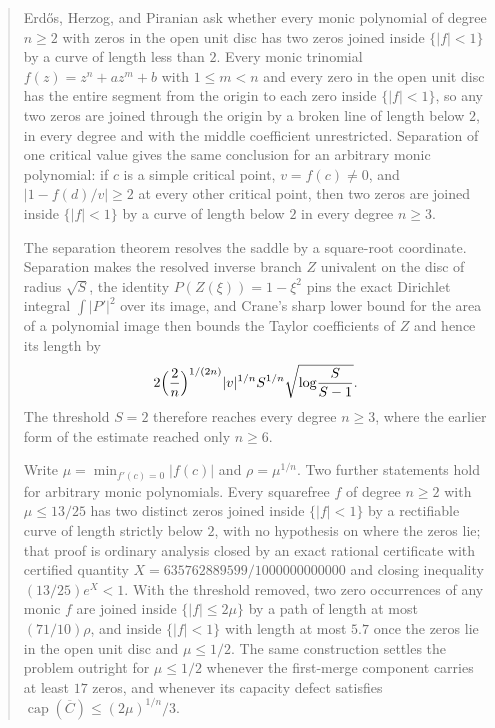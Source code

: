 \maketitle
\noteprovenance

\begin{abstract}
\noindent
Erd\H{o}s, Herzog, and Piranian ask whether every monic polynomial of degree
$n\ge2$ with zeros in the open unit disc has two zeros joined inside
$\{|f|<1\}$ by a curve of length less than $2$.  Every monic trinomial
$f(z)=z^n+az^m+b$ with $1\le m<n$ and every zero in the open unit disc has the
entire segment from the origin to each zero inside $\{|f|<1\}$, so any two
zeros are joined through the origin by a broken line of length below $2$, in
every degree and with the middle coefficient unrestricted.  Separation of one
critical value gives the same conclusion for an arbitrary monic polynomial: if
$c$ is a simple critical point, $v=f(c)\ne0$, and $|1-f(d)/v|\ge2$ at every
other critical point, then two zeros are joined inside $\{|f|<1\}$ by a curve
of length below $2$ in every degree $n\ge3$.

The separation theorem resolves the saddle by a square-root coordinate.
Separation makes the resolved inverse branch $Z$ univalent on the disc of
radius $\sqrt S$, the identity $P(Z(\xi))=1-\xi^2$ pins the exact Dirichlet
integral $\int|P'|^2$ over its image, and Crane's sharp lower bound for the
area of a polynomial image then bounds the Taylor coefficients of $Z$ and
hence its length by
\[
 2\Bigl(\frac2n\Bigr)^{1/(2n)}|v|^{1/n}S^{1/n}
   \sqrt{\log\!\frac{S}{S-1}}.
\]
The threshold $S=2$ therefore reaches every degree $n\ge3$, where the earlier
form of the estimate reached only $n\ge6$.

Write $\mu=\min_{f'(c)=0}|f(c)|$ and $\rho=\mu^{1/n}$.  Two further statements
hold for arbitrary monic polynomials.  Every squarefree $f$ of degree $n\ge2$
with $\mu\le13/25$ has two distinct zeros joined inside $\{|f|<1\}$ by a
rectifiable curve of length strictly below $2$, with no hypothesis on where the
zeros lie; that proof is ordinary analysis closed by an exact rational
certificate with certified quantity $X=635762889599/1000000000000$ and closing
inequality $(13/25)e^{X}<1$.  With the threshold removed, two zero occurrences
of any monic $f$ are joined inside $\{|f|\le2\mu\}$ by a path of length at most
$(71/10)\rho$, and inside $\{|f|<1\}$ with length at most $5.7$ once the zeros
lie in the open unit disc and $\mu\le1/2$.  The same construction settles the
problem outright for $\mu\le1/2$ whenever the first-merge component carries at
least $17$ zeros, and whenever its capacity defect satisfies
$\operatorname{cap}(\overline C)\le(2\mu)^{1/n}/3$.


\end{abstract}
